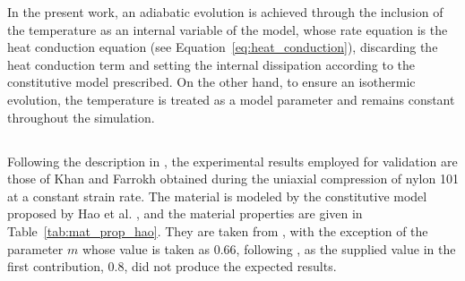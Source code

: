 In the present work, an adiabatic evolution is achieved through the inclusion of the temperature as an internal variable of the model, whose rate equation is the heat conduction equation (see Equation~\eqref{eq:heat_conduction}), discarding the heat conduction term and setting the internal dissipation according to the constitutive model prescribed.
On the other hand, to ensure an isothermic evolution, the temperature is treated as a model parameter and remains constant throughout the simulation.

\subsection{\cite{haoUnifiedAmorphousCrystalline2022}}

Following the description in \cite{haoUnifiedAmorphousCrystalline2022}, the experimental results employed for validation are those of Khan and Farrokh \citep{khanThermomechanicalResponseNylon2006} obtained during the uniaxial compression of nylon 101 at a constant strain rate.
The material is modeled by the constitutive model proposed by Hao et al. \citep{haoUnifiedAmorphousCrystalline2022}, and the material properties are given in Table~\ref{tab:mat_prop_hao}.
They are taken from \cite{haoUnifiedAmorphousCrystalline2022}, with the exception of the parameter $m$ whose value is taken as \num{0.66}, following \cite{haoRatedependentConstitutiveModel2022}, as the supplied value in the first contribution, \num{0.8}, did not produce the expected results.
%
